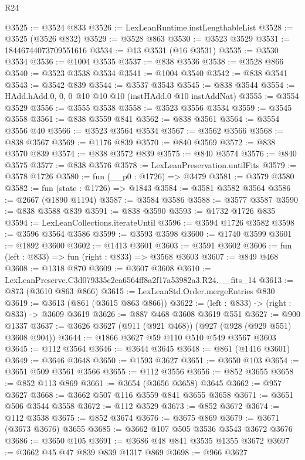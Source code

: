 \begin{lexlean}{R24}
\begin{coremodule}
@3525 := @3524 @833
@3526 := LexLeanRuntime.instLengthableList
@3528 := @3525 (@3526 @832)
@3529 := @3528 @863
@3530 := @3523 @3529
@3531 := 18446744073709551616
@3534 := @13 @3531 (@16 @3531)
@3535 := @3530 @3534
@3536 := @1004 @3535
@3537 := @838 @3536
@3538 := @3528 @866
@3540 := @3523 @3538 @3534
@3541 := @1004 @3540
@3542 := @838 @3541
@3543 := @3542 @839
@3544 := @3537 @3543
@3545 := @838 @3544
@3554 := HAdd.hAdd.{0, 0, 0} @10 @10 @10 (instHAdd.{0} @10 instAddNat)
@3555 := @3554 @3529
@3556 := @3555 @3538
@3558 := @3523 @3556 @3534
@3559 := @3545 @3558
@3561 := @838 @3559 @841
@3562 := @838 @3561
@3564 := @3554 @3556 @40
@3566 := @3523 @3564 @3534
@3567 := @3562 @3566
@3568 := @838 @3567
@3569 := @1176 @839
@3570 := @840 @3569
@3572 := @838 @3570 @839
@3574 := @838 @3572 @839
@3575 := @840 @3574
@3576 := @840 @3575
@3577 := @838 @3576
@3578 := LexLeanPreservation.untilFits
@3579 := @3578 @1726
@3580 := fun (__p0 : @1726) => @3479
@3581 := @3579 @3580
@3582 := fun (state : @1726) => @1843
@3584 := @3581 @3582 @3564
@3586 := @2667 (@1890 @1194)
@3587 := @3584 @3586
@3588 := @3577 @3587
@3590 := @838 @3588 @839
@3591 := @838 @3590
@3593 := @1732 @1726 @835
@3594 := LexLeanCollections.iterateUntil
@3596 := @3594 @1726 @3582
@3598 := @3596 @3564 @3586
@3599 := @3593 @3598
@3600 := @1740 @3599
@3601 := @1892 @3600
@3602 := @1413 @3601
@3603 := @3591 @3602
@3606 := fun (left : @833) => fun (right : @833) => @3568 @3603
@3607 := @849 @468
@3608 := @1318 @870
@3609 := @3607 @3608
@3610 := LexLeanPreserve.C3d079335c2ca6564ff8a2f17a53982a3.R24.__fits_14
@3613 := @873 (@3610 @863 @866)
@3615 := LexLeanStd.Order.mergeEntries @830
@3619 := @3613 (@861 (@3615 @863 @866))
@3622 := (left : @833) -> (right : @833) -> @3609 @3619
@3626 := @887 @468 @3608 @3619 @551
@3627 := @900 @1337
@3637 := @3626 @3627 (@911 (@921 @468)) (@927 (@928 (@929 @551) @3608 @904))
@3644 := @1866 @3627 @59 @110 @510 @549 @3567 @3603
@3645 := @112 @3564
@3646 := @3644 @3645
@3648 := @861 (@1416 @3601)
@3649 := @3646 @3648
@3650 := @1593 @3627
@3651 := @3650 @103
@3654 := @3651 @509 @3561 @3566
@3655 := @112 @3556
@3656 := @852 @3655
@3658 := @852 @113 @869
@3661 := @3654 (@3656 @3658) @3645
@3662 := @957 @3627
@3668 := @3662 @507 @116 @3559 @841 @3655 @3658
@3671 := @3651 @506 @3544 @3558
@3672 := @112 @3529
@3673 := @852 @3672
@3674 := @112 @3538
@3675 := @852 @3674
@3676 := @3675 @869
@3679 := @3671 (@3673 @3676) @3655
@3685 := @3662 @107 @505 @3536 @3543 @3672 @3676
@3686 := @3650 @105
@3691 := @3686 @48 @841 @3535 @1355 @3672
@3697 := @3662 @45 @47 @839 @839 @1317 @869
@3698 := @966 @3627

\end{coremodule}
\end{lexlean}
